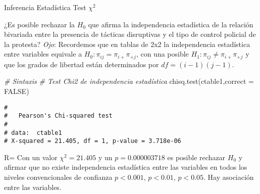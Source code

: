\documentclass[
  8pt,
  ignorenonframetext,
]{beamer}
\newenvironment{Shaded}{\begin{snugshade}}{\end{snugshade}}
\newcommand{\AttributeTok}[1]{\textcolor[rgb]{0.77,0.63,0.00}{#1}}
\newcommand{\CommentTok}[1]{\textcolor[rgb]{0.56,0.35,0.01}{\textit{#1}}}
\newcommand{\ConstantTok}[1]{\textcolor[rgb]{0.00,0.00,0.00}{#1}}
\newcommand{\FunctionTok}[1]{\textcolor[rgb]{0.00,0.00,0.00}{#1}}
\newcommand{\NormalTok}[1]{#1}
\begin{document}
\begin{frame}[fragile]{Inferencia Estadística}
\protect\hypertarget{inferencia-estaduxedstica-1}{}
Test \(\chi^2\)

¿Es posible rechazar la \(H_0\) que afirma la independencia estadística
de la relación bivariada entre la presencia de tácticas disruptivas y el
tipo de control policial de la protesta? \emph{Ojo}: Recordemos que en
tablas de 2x2 la independencia estadística entre variables equivale a
\(H_0: \pi_{ij}=\pi_{i+}\pi_{+j}\), con una posible
\(H_1: \pi_{ij}\neq\pi_{i+}\pi_{+j}\) y que los grados de libertad están
determinados por \(df= (i-1)(j-1)\).

\begin{Shaded}
\begin{Highlighting}[]
\CommentTok{\# Sintaxis}
\CommentTok{\# Test Chi2 de independencia estadística}
\FunctionTok{chisq.test}\NormalTok{(ctable1,}\AttributeTok{correct =} \ConstantTok{FALSE}\NormalTok{)}
\end{Highlighting}
\end{Shaded}

\begin{verbatim}
# 
#   Pearson's Chi-squared test
# 
# data:  ctable1
# X-squared = 21.405, df = 1, p-value = 3.718e-06
\end{verbatim}

R= Con un valor \(\chi^2 = 21.405\) y un \(p=0.000003718\) es posible
rechazar \(H_0\) y afirmar que no existe independencia estadística entre
las variables en todos los niveles convencionales de confianza
\(p<0.001\), \(p<0.01\), \(p<0.05\). Hay asociación entre las variables.
\end{frame}
\end{document}
